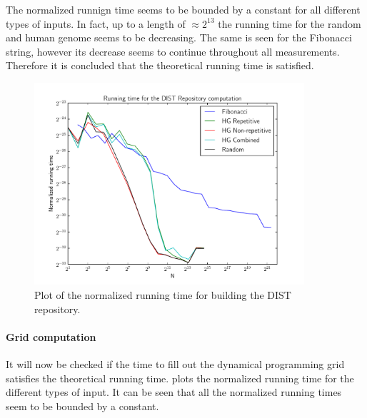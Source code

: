 \documentclass[twoside,11pt,openright]{report}
\begin{document}
The normalized runnign time seems to be bounded by a constant for all different types of inputs. In fact, up to a length of $\approx 2^{13}$ the running time for the random and human genome seems to be decreasing. The same is seen for the Fibonacci string, however its decrease seems to continue throughout all measurements.
Therefore it is concluded that the theoretical running time is satisfied.

\begin{figure}[!htb]
  \centering
  \includegraphics[width=10cm]{combined/dist_runningtime}
  \caption{Plot of the normalized running time for building the DIST repository.}
  \label{fig:benchmark:dist-repo-time}
\end{figure}


\paragraph{Grid computation}
It will now be checked if the time to fill out the dynamical programming grid satisfies the theoretical running time.  plots the normalized running time for the different types of input. It can be seen that all the normalized running times seem to be bounded by a constant.
\end{document}
